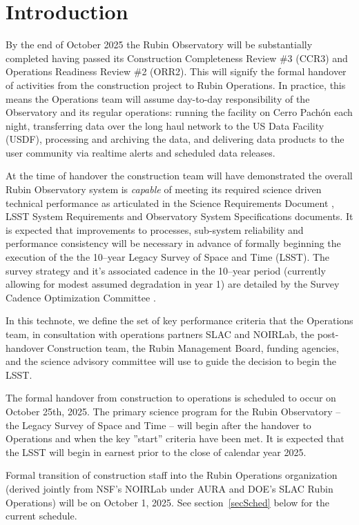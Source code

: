 \section{Introduction}

By the end of October 2025 the Rubin Observatory will be substantially completed having passed its Construction Completeness Review \#3 (CCR3) and Operations Readiness Review \#2 (ORR2).  This will signify the formal handover of activities from the construction project to Rubin Operations. In practice, this means the Operations team \cite[see][]{RDO-018} will assume day-to-day responsibility of the Observatory and its regular operations: running the facility on Cerro Pach\'{o}n each night, transferring data over the long haul network to the US Data Facility (USDF), processing and archiving the data, and delivering data products to the user community via realtime alerts and scheduled data releases. 

At the time of handover the construction team will have demonstrated the overall Rubin Observatory system is {\it capable} of meeting its required science driven technical performance as articulated in the Science Requirements Document \cite{LPM-17}, LSST System Requirements \cite{LSE-29} and Observatory System Specifications \cite{LSE-30} documents.  It is expected that improvements to processes, sub-system reliability and performance consistency will be necessary in advance of formally beginning the execution of the the 10--year Legacy Survey of Space and Time (LSST). The survey strategy and it's associated cadence in the 10--year period (currently allowing for modest assumed degradation in year 1) are detailed by the Survey Cadence Optimization Committee \cite[SCOC,][]{PSTN-056}. 

In this technote, we define the set of key performance criteria that the Operations team, in consultation with operations partners SLAC and NOIRLab, the post-handover Construction team, the Rubin Management Board, funding agencies, and the science advisory committee will use to guide the decision to begin the LSST. 

The formal handover from construction to operations is scheduled to occur on October 25th, 2025. The primary science program for the Rubin Observatory -- the Legacy Survey of Space and Time -- will begin after the handover to Operations and when the key ''start'' criteria have been met.  It is expected that the LSST will begin in earnest prior to the close of calendar year 2025.

Formal transition of construction staff into the Rubin Operations organization (derived jointly from NSF's NOIRLab under AURA and DOE's SLAC Rubin Operations) will be on October 1, 2025. See section~\ref{secSched} below for the current schedule.  
